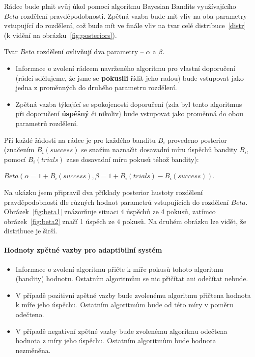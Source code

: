\documentclass[thesis=M,czech]{FITthesis}[2014/05/07]
\begin{document}
Rádce bude plnit svůj úkol pomocí algoritmu Bayesian Bandits využívajícího ${Beta}$ rozdělení pravděpodobnosti. Zpětná vazba bude mít vliv na oba parametry vstupující do rozdělení, což bude mít ve finále vliv na tvar celé distribuce~\ref{distr} (k vidění na obrázku~\ref{fig:posteriors}). 

Tvar ${Beta}$ rozdělení ovlivňují dva parametry – $\alpha$ a $\beta$.

\begin{itemize}
	\item Informace o zvolení rádcem navrženého algoritmu pro vlastní doporučení (rádci sdělujeme, že jsme se \textbf{pokusili} řídit jeho radou) bude vstupovat jako jedna z proměnných do druhého parametru rozdělení.
	\item Zpětná vazba týkající se spokojenosti doporučení (zda byl tento algoritmus při doporučení \textbf{úspěšný} či nikoliv) bude vstupovat jako proměnná do obou parametrů rozdělení.
\end{itemize}

Při každé žádosti na rádce je pro každého banditu $B_i$ provedeno posterior (značením $B_i(success)$ se snažím naznačit dosavadní míru úspěchů bandity $B_i$, pomocí $B_i(trials)$ zase dosavadní míru pokusů téhož bandity):

\begin{center}
${Beta}(\alpha = 1 + B_i(success), \beta = 1 + B_i(trials) - B_i(success))$.
\end{center}

Na ukázku jsem připravil dva příklady posterior hustoty rozdělení pravděpodobnosti dle různých hodnot parametrů vstupujících do rozdělení ${Beta}$. Obrázek~\ref{fig:beta1} znázorňuje situaci 4 úspěchů ze 4 pokusů, zatímco obrázek~\ref{fig:beta2} značí 1 úspěch ze 4 pokusů. Na druhém obrázku lze vidět, že distribuce je širší.

\paragraph{Hodnoty zpětné vazby pro adaptibilní systém}

\begin{itemize}
	\item Informace o zvolení algoritmu přičte k míře pokusů tohoto algoritmu (bandity) hodnotu. Ostatním algoritmům se nic přičítat ani odečítat nebude.
	\item V případě pozitivní zpětné vazby bude zvolenému algoritmu přičtena hodnota k míře jeho úspěchu. Ostatním algoritmům bude od této míry v poměru odečteno.
	\item V případě negativní zpětné vazby bude zvolenému algoritmu odečtena hodnota z míry jeho úspěchu. Ostatním algoritmům bude hodnota nezměněna.
\end{itemize}
\end{document}
